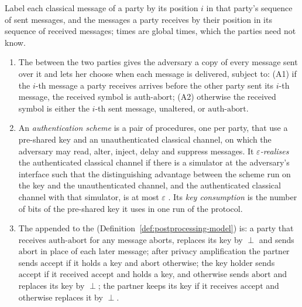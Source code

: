\begin{definition}
\label{def:authenticated-channel}
Label each classical message of a party by its position $i$ in that party's
sequence of sent messages, and the messages a party receives by their
position in its sequence of received messages; times are global times, which
the parties need not know.
\begin{enumerate}[label=(\alph*),leftmargin=2.4em]
\item The
  between the two parties gives the adversary a copy of every message sent
  over it and lets her choose when each message is delivered, subject to:
  (A1) if the $i$-th message a party receives arrives before the other
  party sent its $i$-th message, the received symbol is
  $\mathrm{auth\text{-}abort}$; (A2) otherwise the received symbol is either
  the $i$-th sent message, unaltered, or $\mathrm{auth\text{-}abort}$.
\item An \emph{authentication scheme} is a pair of procedures, one per party,
  that use a pre-shared key and an unauthenticated classical channel, on
  which the adversary may read, alter, inject, delay and suppress messages.
  It \emph{$\varepsilon$-realises} the authenticated classical channel if
  there is a simulator at the adversary's interface such that the
  distinguishing advantage between the scheme run on the key and the
  unauthenticated channel, and the authenticated classical channel with that
  simulator, is at most $\varepsilon$
  \cite[Sec.~II.E, Def.~1]{portmann2022security}. Its \emph{key consumption}
  is the number of bits of the pre-shared key it uses in one run of the
  protocol.
\item The
  appended to the 
  (Definition~\ref{def:postprocessing-model}) is: a party that receives
  $\mathrm{auth\text{-}abort}$ for any message aborts, replaces its key by
  $\perp$ and sends $\mathrm{abort}$ in place of each later message; after
  privacy amplification the partner sends $\mathrm{accept}$ if it holds a key
  and $\mathrm{abort}$ otherwise; the key holder sends $\mathrm{accept}$ if
  it received $\mathrm{accept}$ and holds a key, and otherwise sends
  $\mathrm{abort}$ and replaces its key by $\perp$; the partner keeps its key
  if it receives $\mathrm{accept}$ and otherwise replaces it by $\perp$.
\end{enumerate}
\end{definition}
